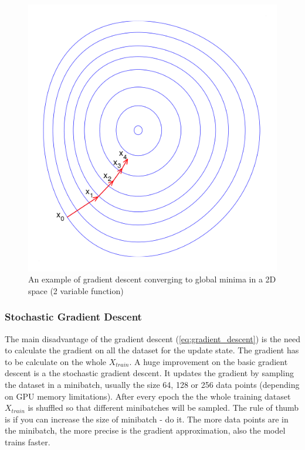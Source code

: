 \documentclass[times, utf8, diplomski]{fer}
\begin{document}
\begin{figure}
  \includegraphics[scale=0.5]{figures/gradient_descent.png}
  \centering
  \caption{An example of gradient descent converging to global minima in a 2D space (2 variable function)}
  \label{fig:local_and_global_function_values}
\end{figure}

\subsubsection{Stochastic Gradient Descent}

The main disadvantage of the gradient descent (\ref{eq:gradient_descent}) is the need to calculate the gradient on all the dataset for the update state. The gradient has to be calculate on the whole $X_{train}$. A huge improvement on the basic gradient descent is a the stochastic gradient descent. It updates the gradient by sampling the dataset in a minibatch, usually the size 64, 128 or 256 data points (depending on GPU memory limitations). After every epoch the the whole training dataset $X_{train}$ is shuffled so that different minibatches will be sampled. The rule of thumb is if you can increase the size of minibatch - do it. The more data points are in the minibatch, the more precise is the gradient approximation, also the model trains faster.
\end{document}
